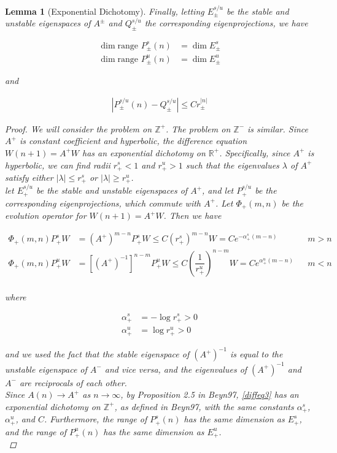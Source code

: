 \documentclass[12pt]{article}
\def\R{{\mathbb R}}
\def\Z{{\mathbb Z}}
\newtheorem{lemma}{Lemma}
\begin{document}
\begin{lemma}[Exponential Dichotomy]
Finally, letting $E_\pm^{s/u}$ be the stable and unstable eigenspaces of $A^\pm$ and $Q_\pm^{s/u}$ the corresponding eigenprojections, we have

\begin{align*}
\dim \text{range }P_\pm^s(n) &= \dim E_\pm^s \\
\dim \text{range }P_\pm^u(n) &= \dim E_\pm^u
\end{align*}

and

\begin{align}\label{projbound}
| P_\pm^{s/u}(n) - Q_\pm^{s/u} | \leq C r_\pm^{|n|}
\end{align}

\begin{proof}
We will consider the problem on $\Z^+$. The problem on $\Z^-$ is similar. Since $A^+$ is constant coefficient and hyperbolic, the difference equation $W(n+1) = A^+ W$ has an exponential dichotomy on $\R^+$. Specifically, since $A^+$ is hyperbolic, we can find radii $r_+^s < 1$ and $r_+^u > 1$ such that the eigenvalues $\lambda$ of $A^+$ satisfy either $|\lambda| \leq r_+^s$ or $|\lambda| \geq r_+^u$.\\

let $E_+^{s/u}$ be the stable and unstable eigenspaces of $A^+$, and let $P_+^{s/u}$ be the corresponding eigenprojections, which commute with $A^+$. Let $\Phi_+(m, n)$ be the evolution operator for $W(n+1) = A^+ W$. Then we have

\begin{align*}
\Phi_+(m, n) P_+^s W &= (A^+)^{m-n} P_+^s W \leq C (r_+^s)^{m-n} W = C e^{-\alpha_+^s (m - n)} && m > n \\
\Phi_+(m, n) P_+^u W &= [(A^+)^{-1}]^{n-m} P_+^u W \leq C \left( \dfrac{1}{r_+^u} \right)^{n-m} W = C e^{\alpha_+^u (m - n)} && m < n \\
\end{align*}

where 

\begin{align*}
\alpha_+^s &= -\log r_+^s > 0 \\
\alpha_+^u &= \log r_+^u > 0
\end{align*}

and we used the fact that the stable eigenspace of $(A^+)^{-1}$ is equal to the unstable eigenspace of $A^-$ and vice versa, and the eigenvalues of $(A^+)^{-1}$ and $A^-$ are reciprocals of each other.\\

Since $A(n) \rightarrow A^+$ as $n \rightarrow \infty$, by Proposition 2.5 in Beyn97, \eqref{diffeq3} has an exponential dichotomy on $\Z^+$, as defined in Beyn97, with the same constants $\alpha_+^s$, $\alpha_+^u$, and $C$. Furthermore, the range of $P_+^s(n)$ has the same dimension as $E_+^s$, and the range of $P_+^u(n)$ has the same dimension as $E_+^u$. \\


\end{proof}
\end{lemma}
\end{document}

